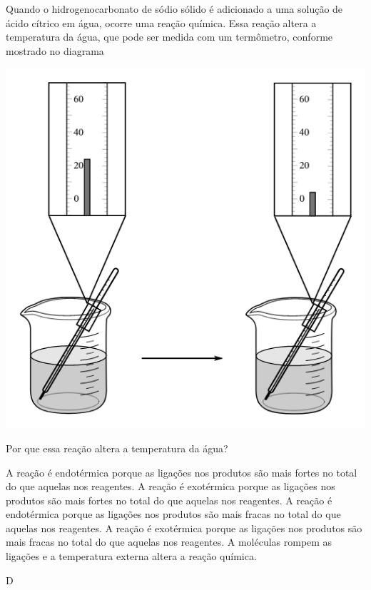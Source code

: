 \documentclass[11pt]{article}
\begin{document}
\begin{exercise}[points=1.0]
Quando o hidrogenocarbonato de sódio sólido é adicionado a uma solução de ácido cítrico em água, ocorre uma reação química. Essa reação altera a temperatura da água, que pode ser medida com um termômetro, conforme mostrado no diagrama

\begin{center}
\includegraphics[scale=.3]{../Listas/termometro.png}
\end{center}


Por que essa reação altera a temperatura da água?
\begin{choice}
\choice A reação é endotérmica porque as ligações nos produtos são mais fortes no total do que aquelas nos reagentes.
\choice A reação é exotérmica porque as ligações nos produtos são mais fortes no total do que aquelas nos reagentes.
\choice A reação é endotérmica porque as ligações nos produtos são mais fracas no total do que aquelas nos reagentes.
\choice A reação é exotérmica porque as ligações nos produtos são mais fracas no total do que aquelas nos reagentes.
\choice A moléculas rompem as ligações e a temperatura externa altera a reação química.
\end{choice}
\end{exercise}
\begin{solution}
D
\end{solution}
\end{document}
